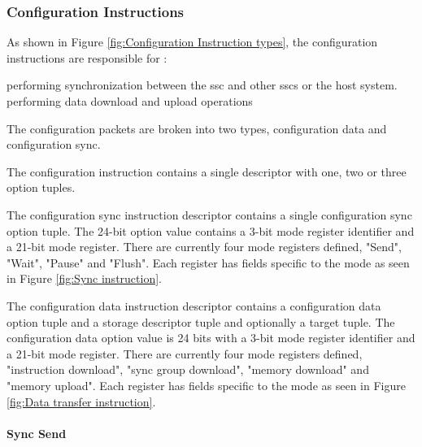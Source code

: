 \subsubsection{Configuration Instructions}
\label{sec:Decoding Configuration Instructions}

As shown in Figure \ref{fig:Configuration Instruction types}, the configuration instructions are responsible for :
\begin{outline}
 \1 performing synchronization between the \ac{ssc} and other \acp{ssc} or the host system.
 \1 performing data download and upload operations
\end{outline}

The configuration packets are broken into two types, configuration data and configuration sync.
\iffalse
Currently the sync instruction has been implemented.
It is assumed at this point that adequate infrastructure and extensibility has been built into the system to allow implementation without adding significant amouts of logic.
\fi

The configuration instruction contains a single descriptor with one, two or three option tuples.

The configuration sync instruction descriptor contains a single configuration sync option tuple. The 24-bit option value contains a 3-bit mode register identifier and a 21-bit mode register.
There are currently four mode registers defined, "Send", "Wait", "Pause" and "Flush". Each register has fields specific to the mode as seen in Figure \ref{fig:Sync instruction}.

The configuration data instruction descriptor contains a configuration data option tuple and a storage descriptor tuple and optionally a target tuple. 
The configuration data option value is 24 bits with a 3-bit mode register identifier and a 21-bit mode register.
There are currently four mode registers defined, "instruction download", "sync group download", "memory download" and "memory upload". Each register has fields specific to the mode as seen in Figure \ref{fig:Data transfer instruction}.

\paragraph{Sync Send}

